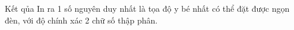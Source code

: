 Kết qủa
In ra 1 số nguyên duy nhất là tọa độ y bé nhất có thể đặt được ngọn đèn, với độ chính xác 2 chữ số thập phân.
